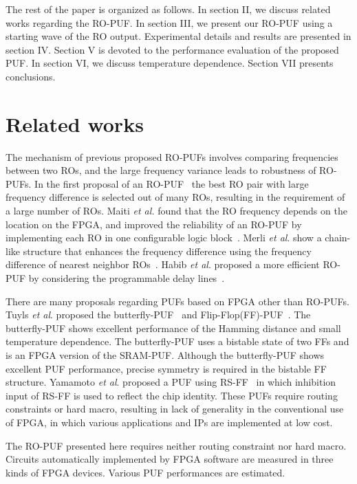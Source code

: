 ﻿\documentclass[aps,preprint,prb,superscriptaddress,amsmath,showpacs,tightenlines]{revtex4}
\begin{document}
The rest of the paper is organized as follows.
In section II, we discuss related works regarding the RO-PUF.
In section III, we present our RO-PUF using a starting wave of the RO output.
Experimental details and results are presented in section IV.
Section V is devoted to the performance evaluation of the proposed  PUF. 
In section VI, we discuss temperature dependence.
Section VII presents conclusions. 

\section{Related works}
The mechanism of previous proposed RO-PUFs involves comparing 
frequencies between two ROs, and the large frequency variance 
leads to robustness of RO-PUFs.
In the first proposal of an RO-PUF~\cite{Suh}
the best RO pair with large frequency difference 
is selected out of many ROs, resulting 
in the requirement of a large number of ROs. 
Maiti {\it et al.} found that the RO frequency depends on 
the location on the FPGA, and improved the reliability of an RO-PUF 
by implementing each RO in one configurable logic block~\cite{Maiti1}.
Merli {\it et al}. show a chain-like structure that  
enhances the frequency difference using the frequency difference
 of nearest neighbor ROs~\cite{Merli}.
Habib {\it et al}.  proposed a more efficient RO-PUF by considering the 
programmable delay lines~\cite{Habib}.


There are many proposals regarding PUFs based on FPGA other than RO-PUFs.
Tuyls {\it et al}. proposed the butterfly-PUF~\cite{butterfly} and Flip-Flop(FF)-PUF~\cite{FF-PUF}.
The butterfly-PUF shows excellent performance of the Hamming distance 
and small temperature dependence.
The butterfly-PUF uses a bistable state of two FFs and 
is an FPGA version of the SRAM-PUF.
Although the butterfly-PUF shows excellent PUF performance, 
precise symmetry is required in the bistable FF structure. 
Yamamoto {\it et al}. proposed a PUF using RS-FF~\cite{Yamamoto}
in which inhibition input  of RS-FF is used to reflect the chip identity.
These PUFs require routing constraints or hard macro, resulting 
in lack of generality in the conventional use of FPGA, in which 
various applications and IPs are implemented at low cost.

The RO-PUF presented here requires neither routing constraint nor hard macro.
Circuits automatically implemented by FPGA software are measured in 
three kinds of FPGA devices. Various PUF performances are estimated.
\end{document}
